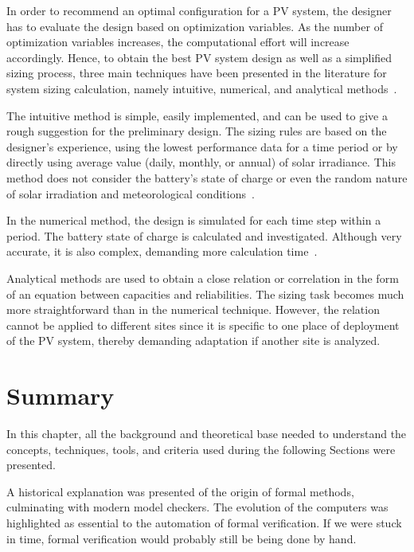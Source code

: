 In order to recommend an optimal configuration for a PV system, 
the designer has to evaluate the design based on optimization variables. 
As the number of optimization variables increases, the computational effort will increase accordingly. Hence, to obtain the best PV system design as well as a simplified sizing process, three main techniques have been presented in the literature for system sizing calculation, namely intuitive, numerical, and analytical methods~\cite{Zhou2010}.

The intuitive method is simple, easily implemented, and can be used to give a rough suggestion for the preliminary design. The sizing rules are based on the designer's experience, using the lowest performance data for a time period or by directly using average value (daily, monthly, or annual) of solar irradiance. This method does not consider the battery's state of charge or even the random nature of solar irradiation and meteorological conditions~\cite{Alsadi2018}.

In the numerical method, the design is simulated for each time step within a period. The battery state of charge is calculated and investigated. Although very accurate, it is also complex, demanding more calculation time~\cite{Park2004}.

Analytical methods are used to obtain a close relation or correlation in the form of an equation between capacities and reliabilities. The sizing task becomes much more straightforward than in the numerical technique. However, the relation cannot be applied to different sites since it is specific to one place of deployment of the PV system, thereby demanding adaptation if another site is analyzed.

\section{Summary}

In this chapter, all the background and theoretical base needed to understand the concepts, techniques, tools, and criteria used during the following Sections were presented.

A historical explanation was presented of the origin of formal methods, culminating with modern model checkers. The evolution of the computers was highlighted as essential to the automation of formal verification. If we were stuck in time, formal verification would probably still be being done by hand.

